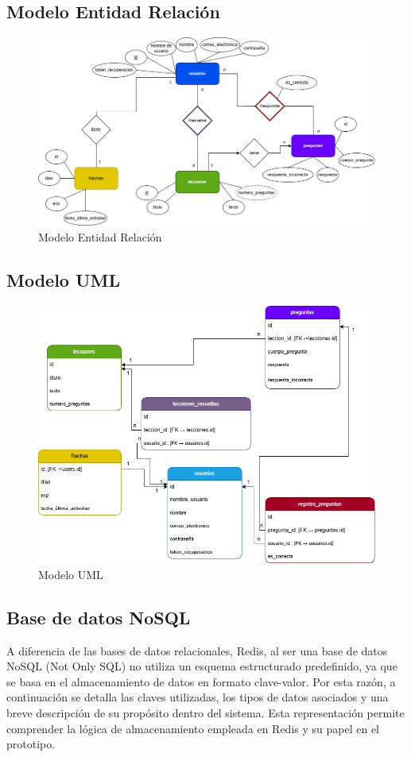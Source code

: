\subsection{Modelo Entidad Relación }

\begin{figure}[H]
  \centering
  \includegraphics[width=0.9\linewidth]{Imagenes/DB_RM.png}
  \caption{Modelo Entidad Relación}
  \label{fig:ER}
\end{figure}


\subsection{Modelo UML}

\begin{figure}[H]
  \centering
  \includegraphics[width=0.6\linewidth]{Imagenes/DB_UML.png}
  \caption{Modelo UML}
  \label{fig:uml}
\end{figure}


\subsection{Base de datos NoSQL}

A diferencia de las bases de datos relacionales, Redis, al ser una base de datos NoSQL (Not Only SQL) no utiliza un esquema estructurado predefinido, ya que se basa en el almacenamiento de datos en formato clave-valor. Por esta razón, a continuación se detalla las claves utilizadas, los tipos de datos asociados y una breve descripción de su propósito dentro del sistema. Esta representación permite comprender la lógica de almacenamiento empleada en Redis y su papel en el prototipo.

